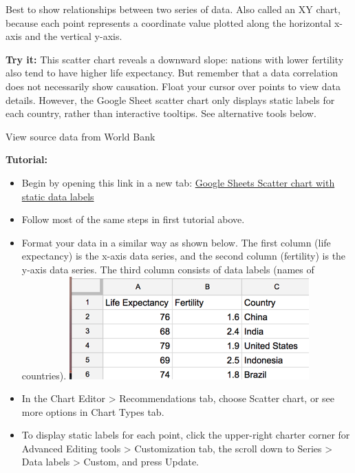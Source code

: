 \documentclass[
  english,
]{book}
\providecommand{\tightlist}{%
  \setlength{\itemsep}{0pt}\setlength{\parskip}{0pt}}
\begin{document}
Best to show relationships between two series of data. Also called an XY chart, because each point represents a coordinate value plotted along the horizontal x-axis and the vertical y-axis.

\textbf{Try it:} This scatter chart reveals a downward slope: nations with lower fertility also tend to have higher life expectancy. But remember that a data correlation does not necessarily show causation. Float your cursor over points to view data details. However, the Google Sheet scatter chart only displays static labels for each country, rather than interactive tooltips. See alternative tools below.

View source data from World Bank

\textbf{Tutorial:}

\begin{itemize}
\tightlist
\item
  Begin by opening this link in a new tab: \href{https://docs.google.com/spreadsheets/d/1LJCj3RaVgaQsAZriV_JDQhBrIBSvnH_N1LBCkZK1bqs/}{Google Sheets Scatter chart with static data labels}
\item
  Follow most of the same steps in first tutorial above.
\item
  Format your data in a similar way as shown below. The first column (life expectancy) is the x-axis data series, and the second column (fertility) is the y-axis data series. The third column consists of data labels (names of countries).
  \includegraphics{images/05-chart/scatter-chart-data.png}
\item
  In the Chart Editor \textgreater{} Recommendations tab, choose Scatter chart, or see more options in Chart Types tab.
\item
  To display static labels for each point, click the upper-right charter corner for Advanced Editing tools \textgreater{} Customization tab, the scroll down to Series \textgreater{} Data labels \textgreater{} Custom, and press Update.

\end{itemize}
\end{document}
